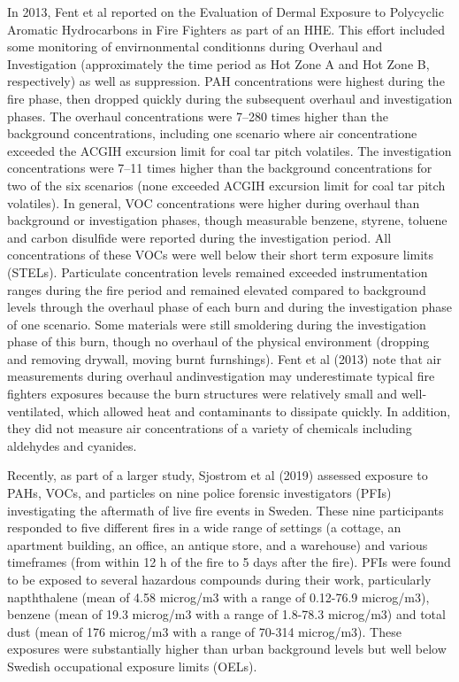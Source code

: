 \documentclass[12pt,oneside]{book}
\begin{document}
In 2013, Fent et al reported on the Evaluation of Dermal Exposure to Polycyclic Aromatic Hydrocarbons in Fire Fighters as part of an HHE.  This effort included some monitoring of envirnonmental conditionns during Overhaul and Investigation (approximately the time period as Hot Zone A and Hot Zone B, respectively) as well as suppression. PAH concentrations were highest during the fire phase, then dropped quickly during the subsequent overhaul and investigation phases. The overhaul concentrations were 7–280 times higher than the background concentrations, including one scenario where air concentratione exceeded the ACGIH excursion limit for coal tar pitch volatiles. The investigation concentrations were 7–11 times higher than the background concentrations for two of the six scenarios (none exceeded ACGIH excursion limit for coal tar pitch volatiles). In general, VOC concentrations were higher during overhaul than background or investigation phases, though measurable benzene, styrene, toluene and carbon disulfide were reported during the investigation period. All concentrations of these VOCs were well below their short term exposure limits (STELs). Particulate concentration levels remained exceeded instrumentation ranges during the fire period and remained elevated compared to background levels through the overhaul phase of each burn and during the investigation phase of one scenario. Some materials were still smoldering during the investigation phase of this burn, though no overhaul of the physical environment (dropping and removing drywall, moving burnt furnshings). Fent et al (2013) note that air measurements during overhaul andinvestigation may underestimate typical fire fighters exposures because the burn structures were relatively small and well-ventilated, which allowed heat and contaminants to dissipate quickly. In addition, they did not measure air concentrations of a variety of chemicals including aldehydes and cyanides.


Recently, as part of a larger study, Sjostrom et al (2019) assessed  exposure to PAHs, VOCs, and particles on nine police forensic investigators (PFIs) investigating the aftermath of live fire events in Sweden. These nine participants responded to five different fires in a wide range of settings (a cottage, an apartment building, an office, an antique store, and a warehouse) and various timeframes (from within 12 h of the fire to 5 days after the fire). PFIs were found to be exposed to several hazardous compounds during their work, particularly napththalene (mean of 4.58 microg/m3 with a range of 0.12-76.9 microg/m3), benzene (mean of 19.3 microg/m3 with a range of 1.8-78.3 microg/m3) and total dust (mean of 176 microg/m3 with a range of 70-314 microg/m3). These exposures were substantially higher than urban background levels but well below Swedish occupational exposure limits (OELs).
\end{document}
